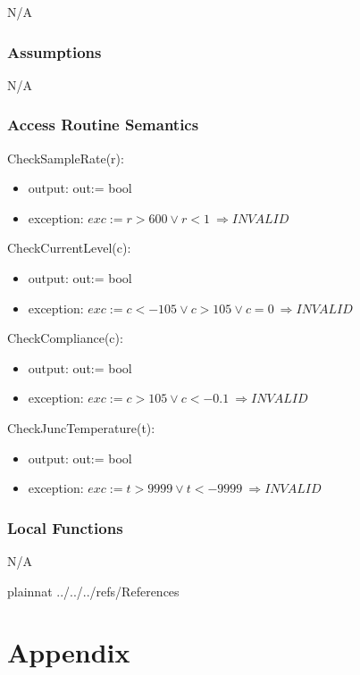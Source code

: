 \documentclass[12pt, titlepage]{article}
\begin{document}
N/A

\subsubsection{Assumptions}
N/A

\subsubsection{Access Routine Semantics}

\noindent CheckSampleRate(r):
\begin{itemize}
\item output: out:= bool
\item exception: $exc:= 
r > 600 \lor r < 1 \
\Rightarrow INVALID$
\end{itemize}

\noindent CheckCurrentLevel(c):
\begin{itemize}
\item output: out:= bool
\item exception: $exc:= 
c < -105 \lor c > 105 \lor c = 0 \
\Rightarrow INVALID$
\end{itemize}

\noindent CheckCompliance(c):
\begin{itemize}
\item output: out:= bool
\item exception: $exc:= 
c > 105 \lor c < -0.1 \
\Rightarrow INVALID$
\end{itemize}

\noindent CheckJuncTemperature(t):
\begin{itemize}
\item output: out:= bool
\item exception: $exc:= 
t > 9999 \lor t < -9999 \
\Rightarrow INVALID$
\end{itemize}


\subsubsection{Local Functions}
N/A
\newpage

 {plainnat}
 {../../../refs/References}

\newpage

\section{Appendix} \label{Appendix}
\end{document}
